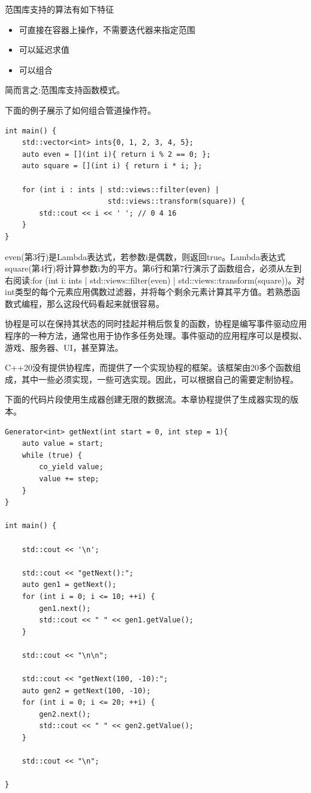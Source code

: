 
范围库支持的算法有如下特征

\begin{itemize}
\item 
可直接在容器上操作，不需要迭代器来指定范围

\item 
可以延迟求值

\item 
可以组合
\end{itemize}

简而言之:范围库支持函数模式。

下面的例子展示了如何组合管道操作符。

\begin{lstlisting}[style=styleCXX]
int main() {
	std::vector<int> ints{0, 1, 2, 3, 4, 5};
	auto even = [](int i){ return i % 2 == 0; };
	auto square = [](int i) { return i * i; };
	
	for (int i : ints | std::views::filter(even) |
						std::views::transform(square)) {
		std::cout << i << ' '; // 0 4 16
	}
}
\end{lstlisting}

even(第3行)是Lambda表达式，若参数i是偶数，则返回true。Lambda表达式square(第4行)将计算参数i为的平方。第6行和第7行演示了函数组合，必须从左到右阅读:for (int i: ints | std::views::filter(even) | std::views::transform(square))。对int类型的每个元素应用偶数过滤器，并将每个剩余元素计算其平方值。若熟悉函数式编程，那么这段代码看起来就很容易。


协程是可以在保持其状态的同时挂起并稍后恢复的函数，协程是编写事件驱动应用程序的一种方法，通常也用于协作多任务处理。事件驱动的应用程序可以是模拟、游戏、服务器、UI，甚至算法。

C++20没有提供协程库，而提供了一个实现协程的框架。该框架由20多个函数组成，其中一些必须实现，一些可选实现。因此，可以根据自己的需要定制协程。

下面的代码片段使用生成器创建无限的数据流。本章协程提供了生成器实现的版本。

\begin{lstlisting}[style=styleCXX]
Generator<int> getNext(int start = 0, int step = 1){
	auto value = start;
	while (true) {
		co_yield value;
		value += step;
	}
}

int main() {
	
	std::cout << '\n';
	
	std::cout << "getNext():";
	auto gen1 = getNext();
	for (int i = 0; i <= 10; ++i) {
		gen1.next();
		std::cout << " " << gen1.getValue();
	}
	
	std::cout << "\n\n";
	
	std::cout << "getNext(100, -10):";
	auto gen2 = getNext(100, -10);
	for (int i = 0; i <= 20; ++i) {
		gen2.next();
		std::cout << " " << gen2.getValue();
	}
	
	std::cout << "\n";

}
\end{lstlisting}

